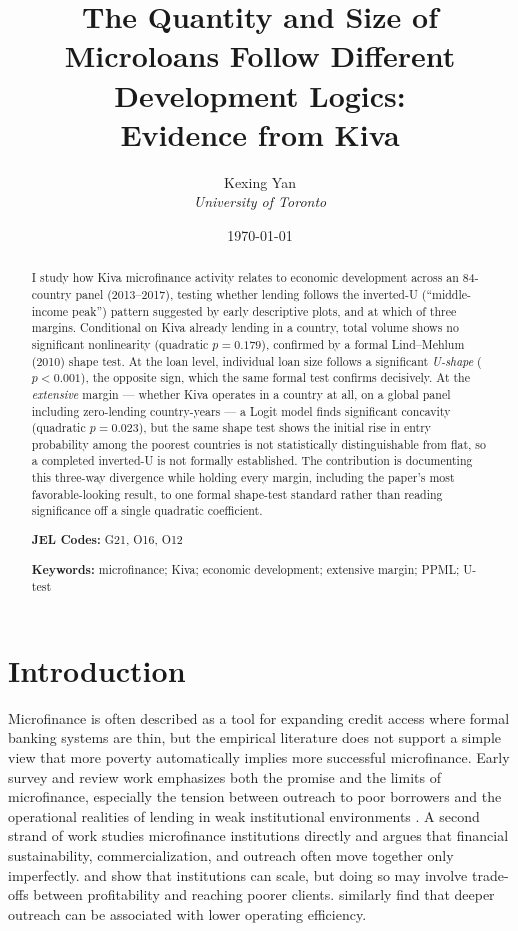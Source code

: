 \documentclass[12pt]{article}
\title{\textbf{The Quantity and Size of Microloans Follow Different Development Logics:\\
Evidence from Kiva}}
\author{Kexing Yan \\ \textit{University of Toronto}}
\date{\today}
\begin{document}
\maketitle

\begin{abstract}
\noindent
I study how Kiva microfinance activity relates to economic development across an 84-country panel
(2013--2017), testing whether lending follows the inverted-U (``middle-income peak'') pattern
suggested by early descriptive plots, and at which of three margins. Conditional on Kiva already
lending in a country, total volume shows no significant nonlinearity (quadratic $p=0.179$), confirmed
by a formal Lind--Mehlum (2010) shape test. At the loan level, individual loan size follows a
significant \emph{U-shape} ($p<0.001$), the opposite sign, which the same formal test confirms
decisively. At the \emph{extensive} margin --- whether Kiva operates in a country at all, on a global
panel including zero-lending country-years --- a Logit model finds significant concavity (quadratic
$p=0.023$), but the same shape test shows the initial rise in entry probability among the poorest
countries is not statistically distinguishable from flat, so a completed inverted-U is not formally
established. The contribution is documenting this three-way divergence while holding every margin,
including the paper's most favorable-looking result, to one formal shape-test standard rather than
reading significance off a single quadratic coefficient.

\vspace{0.5cm}
\noindent \textbf{JEL Codes:} G21, O16, O12

\noindent \textbf{Keywords:} microfinance; Kiva; economic development; extensive margin; PPML;
U-test
\end{abstract}

\doublespacing
{}

\section{Introduction}

Microfinance is often described as a tool for expanding credit access where formal banking systems
are thin, but the empirical literature does not support a simple view that more poverty automatically
implies more successful microfinance. Early survey and review work emphasizes both the promise and
the limits of microfinance, especially the tension between outreach to poor borrowers and the
operational realities of lending in weak institutional environments \citep{morduch1999}. A second
strand of work studies microfinance institutions directly and argues that financial sustainability,
commercialization, and outreach often move together only imperfectly. \citet{cull2007} and
\citet{cull2009} show that institutions can scale, but doing so may involve trade-offs between
profitability and reaching poorer clients. \citet{hermes2011} similarly find that deeper outreach can
be associated with lower operating efficiency.
\end{document}
